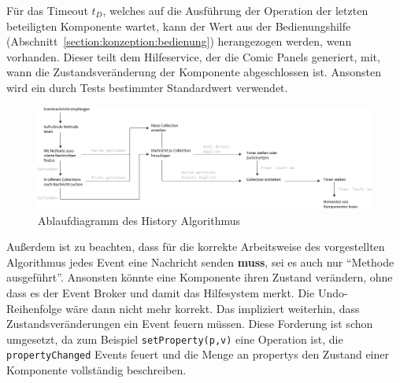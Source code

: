\documentclass[
	headsepline,
	footsepline,
	fontsize=12pt,
	bibliography=totoc
]{scrbook}
\begin{document}
Für das Timeout $t_D$, welches auf die Ausführung der Operation der letzten beteiligten Komponente wartet, kann der Wert aus der Bedienungshilfe (Abschnitt~\ref{section:konzeption:bedienung}) herangezogen werden, wenn vorhanden. Dieser teilt dem Hilfeservice, der die Comic Panels generiert, mit, wann die Zustandsveränderung der Komponente abgeschlossen ist. Ansonsten wird ein durch Tests bestimmter Standardwert verwendet.

\begin{figure}[htbp]
   \centering
   \includegraphics[width=\textwidth]{images/konzeption-dependency-graph-diagram.png}
   \caption{Ablaufdiagramm des History Algorithmus}
   \label{figure:dependency-graph-diagram}
\end{figure}

Außerdem ist zu beachten, dass für die korrekte Arbeitsweise des vorgestellten Algorithmus jedes Event eine Nachricht senden \textbf{muss}, sei es auch nur \enquote{Methode ausgeführt}. Ansonsten könnte eine Komponente ihren Zustand verändern, ohne dass es der Event Broker und damit das Hilfesystem merkt. Die Undo-Reihenfolge wäre dann nicht mehr korrekt. Das impliziert weiterhin, dass Zustandsveränderungen ein Event feuern müssen. Diese Forderung ist schon umgesetzt, da zum Beispiel \texttt{setProperty(p,v)} eine Operation ist, die \texttt{propertyChanged} Events feuert und die Menge an propertys den Zustand einer Komponente vollständig beschreiben.

\end{document}
